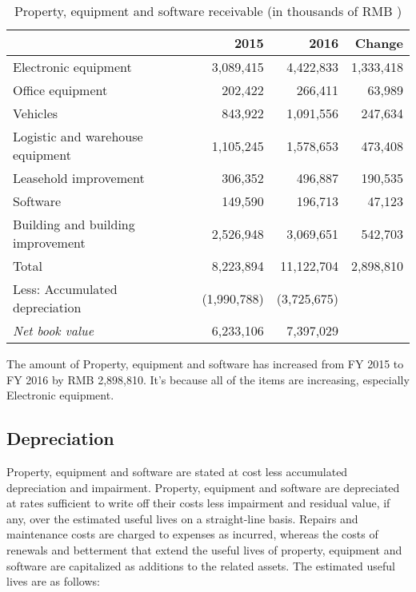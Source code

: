 \begin{table}[H]	
	\begin{center}
		\begin{tabular}{lrrr}
			\toprule
			&\textbf{2015}&\textbf{2016}&\textbf{Change}\\
			\midrule
			Electronic equipment &	3,089,415&	4,422,833&	1,333,418\\
			Office equipment  &	202,422&	266,411&	63,989\\
			Vehicles&	843,922&	1,091,556&	247,634\\
			Logistic and warehouse equipment &	1,105,245&	1,578,653&	473,408\\
			Leasehold improvement&	306,352&	496,887&	190,535\\
			Software& 	149,590&	196,713&	47,123\\
			Building and building improvement & 	2,526,948&	3,069,651&	542,703\\
			Total  &	8,223,894&	11,122,704&	2,898,810\\
			Less: Accumulated depreciation&	(1,990,788)&	(3,725,675)	& \\
			\qquad\emph{Net book value} &	6,233,106&	7,397,029& \\
			\bottomrule
		\end{tabular}
	\end{center}
	\caption{Property, equipment and software receivable (in thousands of RMB \textyen)}\label{table:1}
\end{table}
	
The amount of Property, equipment and software has increased from FY 2015 to FY 2016 by RMB 2,898,810. It’s because all of the items are increasing, especially Electronic equipment.

\subsection{Depreciation}

Property, equipment and software are stated at cost less accumulated depreciation and impairment. Property, equipment and software are depreciated at rates sufficient to write off their costs less impairment and residual value, if any, over the estimated useful lives on a straight-line basis. Repairs and maintenance costs are charged to expenses as incurred, whereas the costs of renewals and betterment that extend the useful lives of property, equipment and software are capitalized as additions to the related assets. The estimated useful lives are as follows:


